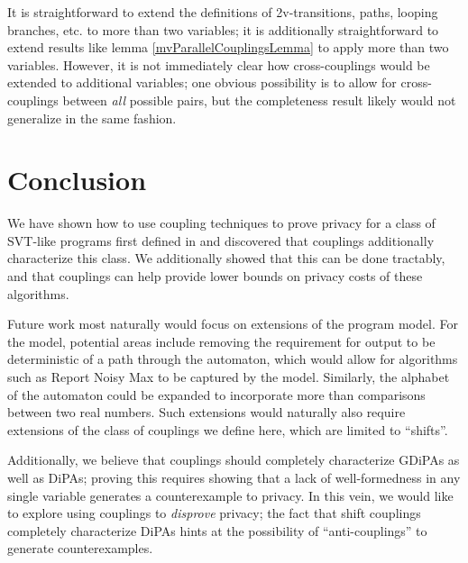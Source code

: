 It is straightforward to extend the definitions of 2v-transitions, paths, looping branches, etc. to more than two variables; it is additionally straightforward to extend results like lemma \ref{mvParallelCouplingsLemma} to apply more than two variables. However, it is not immediately clear how cross-couplings would be extended to additional variables;
one obvious possibility is to allow for cross-couplings between \textit{all} possible pairs, but the completeness result likely would not generalize in the same fashion. 

\section{Conclusion}
We have shown how to use coupling techniques to prove privacy for a class of SVT-like programs first defined in \cite{chadhaLinearTimeDecidability2021} and discovered that couplings additionally characterize this class. We additionally showed that this can be done tractably, and that couplings can help provide lower bounds on privacy costs of these algorithms. 

Future work most naturally would focus on extensions of the program model. For the model, potential areas include removing the requirement for output to be deterministic of a path through the automaton, which would allow for algorithms such as Report Noisy Max to be captured by the model. Similarly, the alphabet of the automaton could be expanded to incorporate more than comparisons between two real numbers. 
Such extensions would naturally also require extensions of the class of couplings we define here, which are limited to ``shifts''. 

Additionally, we believe that couplings should completely characterize GDiPAs as well as DiPAs; proving this requires showing that a lack of well-formedness in any single variable generates a counterexample to privacy. 
In this vein, we would like to explore using couplings to \textit{disprove} privacy; the fact that shift couplings completely characterize DiPAs hints at the possibility of ``anti-couplings'' to generate counterexamples.